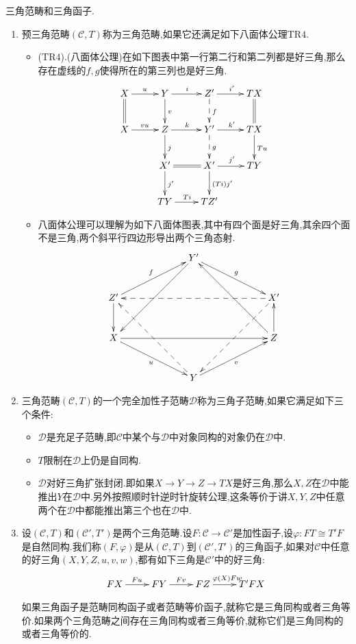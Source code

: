 三角范畴和三角函子.
\begin{enumerate}
	\item 预三角范畴$(\mathscr{C},T)$称为三角范畴,如果它还满足如下八面体公理$\mathrm{TR}4$.
	\begin{itemize}
		\item ($\mathrm{TR}4$).(八面体公理)在如下图表中第一行第二行和第二列都是好三角,那么存在虚线的$f,g$使得所在的第三列也是好三角.
		$$\xymatrix{X\ar[r]^u\ar@{=}[d]&Y\ar[r]^i\ar[d]^v&Z'\ar[r]^{i'}\ar@{-->}[d]^f&TX\ar@{=}[d]\\X\ar[r]^{vu}&Z\ar[r]^k\ar[d]^j&Y'\ar[r]^{k'}\ar@{-->}[d]^g&TX\ar[d]^{Tu}\\&X'\ar@{=}[r]\ar[d]^{j'}&X'\ar[r]^{j'}\ar[d]^{(Ti)j'}&TY\\&TY\ar[r]^{Ti}&TZ'&}$$
		\item 八面体公理可以理解为如下八面体图表,其中有四个面是好三角,其余四个面不是三角,两个斜平行四边形导出两个三角态射.
		$$\xymatrix@!{&&Y'\ar[drr]^g\ar[ddll]&&\\Z'\ar[d]\ar[urr]^f&&&&X'\ar@{-->}[ddll]\ar@{-->}[llll]\\X\ar[rrrr]\ar[drr]_u&&&&Z\ar[u]\ar[uull]\\&&Y\ar[urr]_v\ar@{-->}[uull]&&}$$
	\end{itemize}
    \item 三角范畴$(\mathscr{C},T)$的一个完全加性子范畴$\mathscr{D}$称为三角子范畴,如果它满足如下三个条件:
    \begin{itemize}
    	\item $\mathscr{D}$是充足子范畴,即$\mathscr{C}$中某个与$\mathscr{D}$中对象同构的对象仍在$\mathscr{D}$中.
    	\item $T$限制在$\mathscr{D}$上仍是自同构.
    	\item $\mathscr{D}$对好三角扩张封闭.即如果$X\to Y\to Z\to TX$是好三角,那么$X,Z$在$\mathscr{D}$中能推出$Y$在$\mathscr{D}$中.另外按照顺时针逆时针旋转公理,这条等价于讲$X,Y,Z$中任意两个在$\mathscr{D}$中都能推出第三个也在$\mathscr{D}$中.
    \end{itemize}
    \item 设$(\mathscr{C},T)$和$(\mathscr{C}',T')$是两个三角范畴.设$F:\mathscr{C}\to\mathscr{C}'$是加性函子,设$\varphi:FT\cong T'F$是自然同构.我们称$(F,\varphi)$是从$(\mathscr{C},T)$到$(\mathscr{C}',T')$的三角函子,如果对$\mathscr{C}$中任意的好三角$(X,Y,Z,u,v,w)$,都有如下三角是$\mathscr{C}'$中的好三角:
    $$\xymatrix{FX\ar[r]^{Fu}&FY\ar[r]^{Fv}&FZ\ar[r]^{\varphi(X)Fw}&T'FX}$$
    
    如果三角函子是范畴同构函子或者范畴等价函子,就称它是三角同构或者三角等价.如果两个三角范畴之间存在三角同构或者三角等价,就称它们是三角同构的或者三角等价的.
\end{enumerate}
